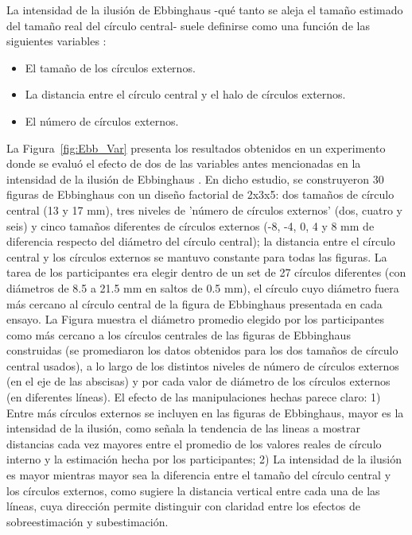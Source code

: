 La intensidad de la ilusión de Ebbinghaus -qué tanto se aleja el tamaño estimado del tamaño real del círculo central- suele definirse como una función de las siguientes variables \parencite{Massaro1971, Girgus1972, Roberts2005}: 

\begin{itemize}
\item El tamaño de los círculos externos.
\item La distancia entre el círculo central y el halo de círculos externos.
\item El número de círculos externos.
\end{itemize}

La Figura~\ref{fig:Ebb_Var} presenta los resultados obtenidos en un experimento donde se evaluó el efecto de dos de las variables antes mencionadas en la intensidad de la ilusión de Ebbinghaus \parencite{Massaro1971}. En dicho estudio, se construyeron 30 figuras de Ebbinghaus con un diseño factorial de 2x3x5: dos tamaños de círculo central (13 y 17 mm), tres niveles de 'número de círculos externos' (dos, cuatro y seis) y cinco tamaños diferentes de círculos externos (-8, -4, 0, 4 y 8 mm de diferencia respecto del diámetro del círculo central); la distancia entre el círculo central y los círculos externos se mantuvo constante para todas las figuras. La tarea de los participantes era elegir dentro de un set de 27 círculos diferentes (con diámetros de 8.5 a 21.5 mm en saltos de 0.5 mm), el círculo cuyo diámetro fuera más cercano al círculo central de la figura de Ebbinghaus presentada en cada ensayo. La Figura muestra el diámetro promedio elegido por los participantes como más cercano a los círculos centrales de las figuras de Ebbinghaus construidas (se promediaron los datos obtenidos para los dos tamaños de círculo central usados), a lo largo de los distintos niveles de número de círculos externos (en el eje de las abscisas) y por cada valor de diámetro de los círculos externos (en diferentes líneas). El efecto de las manipulaciones hechas parece claro: 1) Entre más círculos externos se incluyen en las figuras de Ebbinghaus, mayor es la intensidad de la ilusión, como señala la tendencia de las lineas a mostrar distancias cada vez mayores entre el promedio de los valores reales de círculo interno y la estimación hecha por los participantes; 2) La intensidad de la ilusión es mayor mientras mayor sea la diferencia entre el tamaño del círculo central y los círculos externos, como sugiere la distancia vertical entre cada una de las líneas, cuya dirección permite distinguir con claridad entre los efectos de sobreestimación y subestimación.\\

